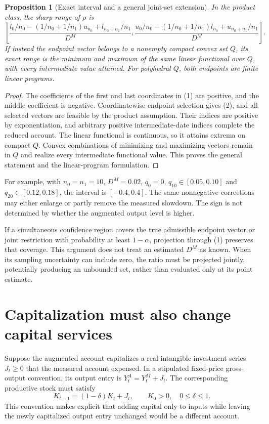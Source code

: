 \documentclass[11pt]{article}
\newtheorem{proposition}[theorem]{Proposition}
\theoremstyle{definition}
\begin{document}
\begin{proposition}[Exact interval and a general joint-set extension]
In the product class, the sharp range of $\rho$ is
\[
 \left[
 \frac{l_0/n_0-(1/n_0+1/n_1)u_{n_0}+l_{n_0+n_1}/n_1}{D^M},
 \frac{u_0/n_0-(1/n_0+1/n_1)l_{n_0}+u_{n_0+n_1}/n_1}{D^M}
 \right].
 \tag{2}
\]
If instead the endpoint vector belongs to a nonempty compact convex set $Q$, its exact range is the minimum and maximum of the same linear functional over $Q$, with every intermediate value attained. For polyhedral $Q$, both endpoints are finite linear programs.
\end{proposition}
\begin{proof}
The coefficients of the first and last coordinates in (1) are positive, and the middle coefficient is negative. Coordinatewise endpoint selection gives (2), and all selected vectors are feasible by the product assumption. Their indices are positive by exponentiation, and arbitrary positive intermediate-date indices complete the reduced account. The linear functional is continuous, so it attains extrema on compact $Q$. Convex combinations of minimizing and maximizing vectors remain in $Q$ and realize every intermediate functional value. This proves the general statement and the linear-program formulation.
\end{proof}
For example, with $n_0=n_1=10$, $D^M=0.02$, $q_0=0$, $q_{10}\in[0.05,0.10]$ and $q_{20}\in[0.12,0.18]$, the interval is $[-0.4,0.4]$. The same nonnegative corrections may either enlarge or partly remove the measured slowdown. The sign is not determined by whether the augmented output level is higher.

If a simultaneous confidence region covers the true admissible endpoint vector or joint restriction with probability at least $1-\alpha$, projection through (1) preserves that coverage. This argument does not treat an estimated $D^M$ as known. When its sampling uncertainty can include zero, the ratio must be projected jointly, potentially producing an unbounded set, rather than evaluated only at its point estimate.

\section*{Capitalization must also change capital services}
Suppose the augmented account capitalizes a real intangible investment series $J_t\ge0$ that the measured account expensed. In a stipulated fixed-price gross-output convention, its output entry is $Y_t^A=Y_t^M+J_t$. The corresponding productive stock must satisfy
\[
 K_{t+1}=(1-\delta)K_t+J_t,\qquad K_0>0,\quad 0\le\delta\le1.
 \tag{3}
\]
This convention makes explicit that adding capital only to inputs while leaving the newly capitalized output entry unchanged would be a different account.
\end{document}
